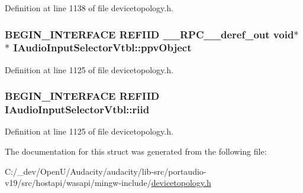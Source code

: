 Definition at line 1138 of file devicetopology.\+h.

\subsubsection[{\texorpdfstring{ppv\+Object}{ppvObject}}]{\setlength{\rightskip}{0pt plus 5cm}B\+E\+G\+I\+N\+\_\+\+I\+N\+T\+E\+R\+F\+A\+CE {\bf R\+E\+F\+I\+ID} {\bf \+\_\+\+\_\+\+R\+P\+C\+\_\+\+\_\+deref\+\_\+out} {\bf void}$\ast$$\ast$ I\+Audio\+Input\+Selector\+Vtbl\+::ppv\+Object}\hypertarget{struct_i_audio_input_selector_vtbl_a52884398441e59b740c6610306e8e1bf}{}\label{struct_i_audio_input_selector_vtbl_a52884398441e59b740c6610306e8e1bf}


Definition at line 1125 of file devicetopology.\+h.

\subsubsection[{\texorpdfstring{riid}{riid}}]{\setlength{\rightskip}{0pt plus 5cm}B\+E\+G\+I\+N\+\_\+\+I\+N\+T\+E\+R\+F\+A\+CE {\bf R\+E\+F\+I\+ID} I\+Audio\+Input\+Selector\+Vtbl\+::riid}\hypertarget{struct_i_audio_input_selector_vtbl_a7964de7bac4d0e60f60f31368cef5596}{}\label{struct_i_audio_input_selector_vtbl_a7964de7bac4d0e60f60f31368cef5596}


Definition at line 1125 of file devicetopology.\+h.



The documentation for this struct was generated from the following file\+:\begin{DoxyCompactItemize}
\item 
C\+:/\+\_\+dev/\+Open\+U/\+Audacity/audacity/lib-\/src/portaudio-\/v19/src/hostapi/wasapi/mingw-\/include/\hyperlink{devicetopology_8h}{devicetopology.\+h}\end{DoxyCompactItemize}
